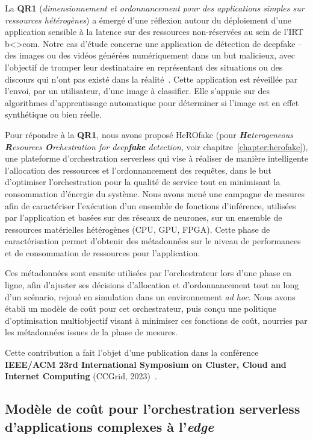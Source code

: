 La \textbf{QR1} (\textit{dimensionnement et ordonnancement pour des applications simples sur ressources hétérogènes}) a émergé d'une réflexion autour du déploiement d'une application sensible à la latence sur des ressources non-réservées au sein de l'IRT b{\textless\textgreater}com. Notre cas d'étude concerne une application de détection de deepfake -- des images ou des vidéos générées numériquement dans un but malicieux, avec l'objectif de tromper leur destinataire en représentant des situations ou des discours qui n'ont pas existé dans la réalité~\cite{westerlundEmergenceDeepfakeTechnology2019}. Cette application est réveillée par l'envoi, par un utilisateur, d'une image à classifier. Elle s'appuie sur des algorithmes d'apprentissage automatique pour déterminer si l'image est en effet synthétique ou bien réelle.

\sloppy Pour répondre à la \textbf{QR1}, nous avons proposé HeROfake (pour \textit{\textbf{He}terogeneous \textbf{R}esources \textbf{O}rchestration for deep\textbf{fake} detection}, voir chapitre~\ref{chapter:herofake}), une plateforme d'orchestration serverless qui vise à réaliser de manière intelligente l'allocation des ressources et l'ordonnancement des requêtes, dans le but d'optimiser l'orchestration pour la qualité de service tout en minimisant la consommation d'énergie du système. Nous avons mené une campagne de mesures afin de caractériser l'exécution d'un ensemble de fonctions d'inférence, utilisées par l'application et basées sur des réseaux de neurones, sur un ensemble de ressources matérielles hétérogènes (\gls{CPU}, \gls{GPU}, \gls{FPGA}). Cette phase de caractérisation permet d'obtenir des métadonnées sur le niveau de performances et de consommation de ressources pour l'application.

Ces métadonnées sont ensuite utilisées par l'orchestrateur lors d'une phase en ligne, afin d'ajuster ses décisions d'allocation et d'ordonnancement tout au long d'un scénario, rejoué en simulation dans un environnement \textit{ad hoc}. Nous avons établi un modèle de coût pour cet orchestrateur, puis conçu une politique d'optimisation multiobjectif visant à minimiser ces fonctions de coût, nourries par les métadonnées issues de la phase de mesures.

Cette contribution a fait l'objet d'une publication dans la conférence \textbf{IEEE/ACM 23rd International Symposium on Cluster, Cloud and Internet Computing} (CCGrid, 2023)~\cite{herofake}.

\subsection{Modèle de coût pour l'orchestration serverless d'applications complexes à l'\textit{edge}}

